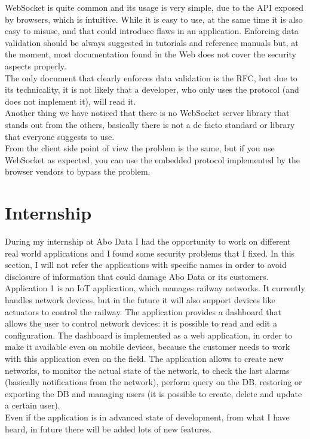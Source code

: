WebSocket is quite common and its usage is very simple, due to the API exposed by browsers, which is intuitive.
While it is easy to use, at the same time it is also easy to misuse, and that could introduce flaws in an application.
Enforcing data validation should be always suggested in tutorials and reference manuals but, at the moment, most documentation found in
the Web does not cover the security aspects properly.\\
The only document that clearly enforces data validation is the RFC, but due to its technicality, it is not likely that
a developer, who only uses the protocol (and does not implement it), will read it.\\
Another thing we have noticed that there is no WebSocket server library that stands out from the others, basically there is
not a de facto standard or library that everyone suggests to use.\\
From the client side point of view the problem is the same, but if you use WebSocket as expected, you can use the embedded
protocol implemented by the browser vendors to bypass the problem.



\section{Internship}

During my internship at Abo Data I had the opportunity to work on different real world applications and I found some security problems that I fixed.\newline
In this section, I will not refer the applications with specific names in order to avoid disclosure of information that could damage Abo Data or its customers.\\

Application 1 is an IoT application, which manages railway networks. It currently handles network devices, but in the future it will also support devices like actuators to control the railway.
The application provides a dashboard that allows the user to control network devices: it is possible to read and edit a configuration.
The dashboard is implemented as a web application, in order to make it available even on mobile devices, because the customer needs
to work with this application even on the field.\newline
The application allows to create new networks, to monitor the actual state of the network, to check the last alarms (basically notifications from the network), perform query on the DB, restoring or exporting the DB and managing users (it is possible to create, delete and update a certain user).\\
Even if the application is in advanced state of development, from what I have heard, in future there will be added lots of new features.\\

